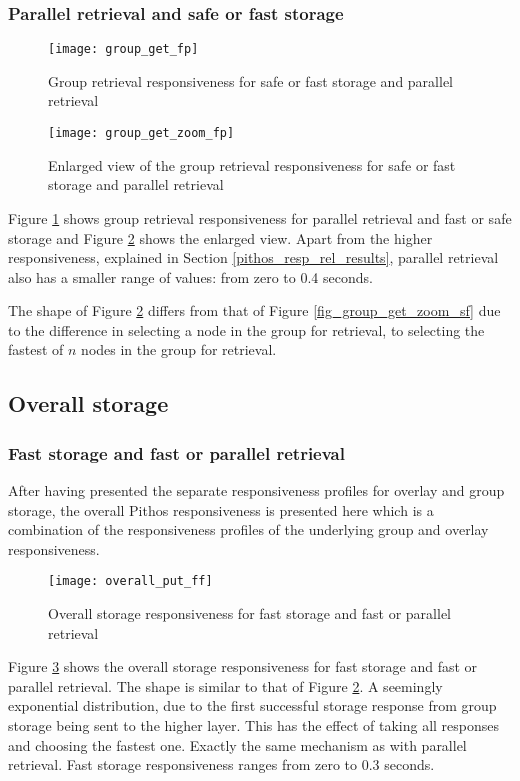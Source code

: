 \subsubsection{Parallel retrieval and safe or fast storage}
\begin{figure}[htbp]
 \centering
 \texttt{[image: group\_get\_fp]}
 \caption{Group retrieval responsiveness for safe or fast storage and parallel retrieval}
 \label{fig_group_get_fp}
\end{figure}

\begin{figure}[htbp]
 \centering
 \texttt{[image: group\_get\_zoom\_fp]}
 \caption{Enlarged view of the group retrieval responsiveness for safe or fast storage and parallel retrieval}
 \label{fig_group_get_zoom_fp}
\end{figure}
%
Figure \ref{fig_group_get_fp} shows group retrieval responsiveness for parallel retrieval and fast or safe storage and Figure \ref{fig_group_get_zoom_fp} shows the enlarged view. Apart from the higher responsiveness, explained in Section \ref{pithos_resp_rel_results}, parallel retrieval also has a smaller range of values: from zero to 0.4 seconds.

The shape of Figure \ref{fig_group_get_zoom_fp} differs from that of Figure \ref{fig_group_get_zoom_sf} due to the difference in selecting a node in the group for retrieval, to selecting the fastest of $n$ nodes in the group for retrieval.

\subsection{Overall storage}

\subsubsection{Fast storage and fast or parallel retrieval}
After having presented the separate responsiveness profiles for overlay and group storage, the overall Pithos responsiveness is presented here which is a combination of the responsiveness profiles of the underlying group and overlay responsiveness.

\begin{figure}[htbp]
 \centering
 \texttt{[image: overall\_put\_ff]}
 \caption{Overall storage responsiveness for fast storage and fast or parallel retrieval}
 \label{fig_overall_put_ff}
\end{figure}
%
Figure \ref{fig_overall_put_ff} shows the overall storage responsiveness for fast storage and fast or parallel retrieval. The shape is similar to that of Figure \ref{fig_group_get_zoom_fp}. A seemingly exponential distribution, due to the first successful storage response from group storage being sent to the higher layer. This has the effect of taking all responses and choosing the fastest one. Exactly the same mechanism as with parallel retrieval. Fast storage responsiveness ranges from zero to 0.3 seconds.

